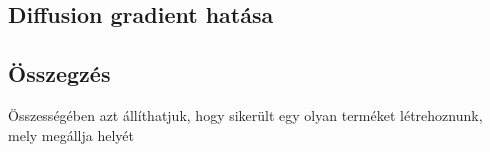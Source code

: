 \begin{minipage}{\linewidth}
\begin{multicols}{3}
\begin{Figure}
		\end{Figure}
	\end{multicols}
\end{minipage}


\subsection{Diffusion gradient hatása}
\subsection{Összegzés}

Összességében azt állíthatjuk, hogy sikerült egy olyan terméket létrehoznunk, mely megállja helyét
